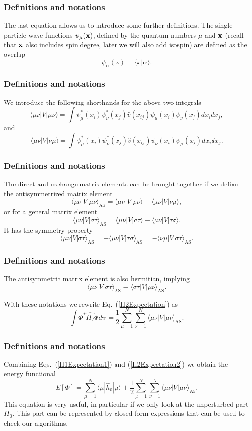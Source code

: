 \documentclass[compress]{beamer}
\begin{document}
\frame
{
  \frametitle{Definitions and notations}
\begin{small}
{\scriptsize
The last equation allows us to  introduce some further definitions.  
The single-particle wave functions $\psi_{\mu}({\bf x})$, defined by the quantum numbers $\mu$ and ${\bf x}$
(recall that ${\bf x}$ also includes spin degree, later we will also add isospin)   are defined as the overlap 
\[
   \psi_{\alpha}(x)  = \langle x | \alpha \rangle .
\]

}
\end{small}
}
\frame
{
  \frametitle{Definitions and notations}
\begin{small}
{\scriptsize
We introduce the following shorthands for the above two integrals
\[
\langle \mu\nu|V|\mu\nu\rangle =  \int \psi_{\mu}^*(x_i)\psi_{\nu}^*(x_j)\hat{v}(x_{ij})\psi_{\mu}(x_i)\psi_{\nu}(x_j)
    dx_idx_j,
\]
and 
\[
\langle \mu\nu|V|\nu\mu\rangle = \int \psi_{\mu}^*(x_i)\psi_{\nu}^*(x_j)
  \hat{v}(x_{ij})\psi_{\nu}(x_i)\psi_{\mu}(x_j)
  dx_idx_j.  
\]
}
\end{small}
}
\frame
{
  \frametitle{Definitions and notations}
\begin{small}
{\scriptsize
The direct and exchange matrix elements can be  brought together if we define the antisymmetrized matrix element
\[
\langle \mu\nu|V|\mu\nu\rangle_{\mathrm{AS}}= \langle \mu\nu|V|\mu\nu\rangle-\langle \mu\nu|V|\nu\mu\rangle,
\]
or for a general matrix element  
\[
\langle \mu\nu|V|\sigma\tau\rangle_{\mathrm{AS}}= \langle \mu\nu|V|\sigma\tau\rangle-\langle \mu\nu|V|\tau\sigma\rangle.
\]
It has the symmetry property
\[
\langle \mu\nu|V|\sigma\tau\rangle_{\mathrm{AS}}= -\langle \mu\nu|V|\tau\sigma\rangle_{\mathrm{AS}}=-\langle \nu\mu|V|\sigma\tau\rangle_{\mathrm{AS}}.
\]
}
\end{small}
}
\frame
{
  \frametitle{Definitions and notations}
\begin{small}
{\scriptsize
The antisymmetric matrix element is also hermitian, implying 
\[
\langle \mu\nu|V|\sigma\tau\rangle_{\mathrm{AS}}= \langle \sigma\tau|V|\mu\nu\rangle_{\mathrm{AS}}.
\]

With these notations we rewrite Eq.~(\ref{H2Expectation}) as 
\begin{equation}
  \int \Phi^*\hat{H_I}\Phi d\mathbf{\tau} 
  = \frac{1}{2}\sum_{\mu=1}^N\sum_{\nu=1}^N \langle \mu\nu|V|\mu\nu\rangle_{\mathrm{AS}}.
\label{H2Expectation2}
\end{equation}

}
\end{small}
}
\frame
{
  \frametitle{Definitions and notations}
\begin{small}
{\scriptsize
Combining Eqs.~(\ref{H1Expectation1}) and
(\ref{H2Expectation2}) we obtain the energy functional 
\begin{equation}
  E[\Phi] 
  = \sum_{\mu=1}^N \langle \mu | \hat{h}_0 | \mu \rangle +
  \frac{1}{2}\sum_{{\mu}=1}^N\sum_{{\nu}=1}^N \langle \mu\nu|V|\mu\nu\rangle_{\mathrm{AS}}.
\label{FunctionalEPhi}
\end{equation}
This equation is very useful, in particular if we only look at the unperturbed part $H_0$. This part can be represented by closed form expressions that can be used to check our algorithms.
}
\end{small}
}
\end{document}
